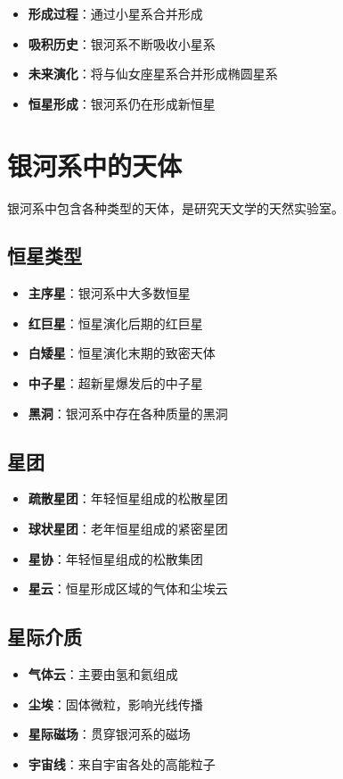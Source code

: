 \documentclass[12pt,UTF8]{ctexbook}
\begin{document}
\begin{itemize}
  \item \textbf{形成过程}：通过小星系合并形成
  \item \textbf{吸积历史}：银河系不断吸收小星系
  \item \textbf{未来演化}：将与仙女座星系合并形成椭圆星系
  \item \textbf{恒星形成}：银河系仍在形成新恒星
\end{itemize}

\section{银河系中的天体}

银河系中包含各种类型的天体，是研究天文学的天然实验室。

\subsection{恒星类型}

\begin{itemize}
  \item \textbf{主序星}：银河系中大多数恒星
  \item \textbf{红巨星}：恒星演化后期的红巨星
  \item \textbf{白矮星}：恒星演化末期的致密天体
  \item \textbf{中子星}：超新星爆发后的中子星
  \item \textbf{黑洞}：银河系中存在各种质量的黑洞
\end{itemize}

\subsection{星团}

\begin{itemize}
  \item \textbf{疏散星团}：年轻恒星组成的松散星团
  \item \textbf{球状星团}：老年恒星组成的紧密星团
  \item \textbf{星协}：年轻恒星组成的松散集团
  \item \textbf{星云}：恒星形成区域的气体和尘埃云
\end{itemize}

\subsection{星际介质}

\begin{itemize}
  \item \textbf{气体云}：主要由氢和氦组成
  \item \textbf{尘埃}：固体微粒，影响光线传播
  \item \textbf{星际磁场}：贯穿银河系的磁场
  \item \textbf{宇宙线}：来自宇宙各处的高能粒子
\end{itemize}
\end{document}

